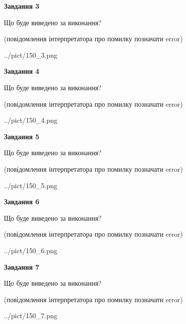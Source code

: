 \documentclass[12pt, ukrainian]{article}
\begin{document}
{\begin {large}
{\begin {center}\textbf{Завдання 3}\end {center}}\par
Що буде виведено за виконання?\par
 (повідомлення інтерпретатора про помилку позначати error)\par
\begin{center}
	{../pict/150_3.png}
\end{center}
\newpage

{\begin {center}\textbf{Завдання 4}\end {center}}\par
Що буде виведено за виконання?\par
 (повідомлення інтерпретатора про помилку позначати error)\par
\begin{center}
	{../pict/150_4.png}
\end{center}
\newpage

{\begin {center}\textbf{Завдання 5}\end {center}}\par
Що буде виведено за виконання?\par
 (повідомлення інтерпретатора про помилку позначати error)\par
\begin{center}
	{../pict/150_5.png}
\end{center}
\newpage

{\begin {center}\textbf{Завдання 6}\end {center}}\par
Що буде виведено за виконання?\par
 (повідомлення інтерпретатора про помилку позначати error)\par
\begin{center}
	{../pict/150_6.png}
\end{center}
\newpage

{\begin {center}\textbf{Завдання 7}\end {center}}\par
Що буде виведено за виконання?\par
 (повідомлення інтерпретатора про помилку позначати error)\par
\begin{center}
	{../pict/150_7.png}
\end{center}
\newpage


\end{large}}
\end{document}
